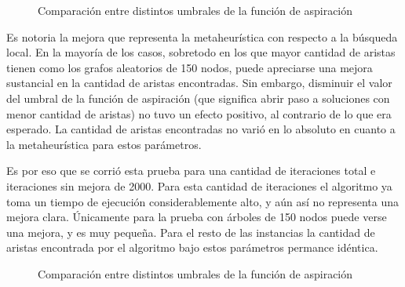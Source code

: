 

\begin{figure}[H]
    \centering
    \caption{Comparación entre distintos umbrales de la función de aspiración}
    \pgfplotstabletypeset[
        columns={0, solutions, localsearch, lowiterationlowaspiration, lowiterationhighaspiration, lowiterationfullaspiration}
    ]{\optimalsolutions}
\end{figure}

Es notoria la mejora que representa la metaheurística con respecto a la búsqueda local. En la mayoría de los casos, sobretodo en los que mayor cantidad de aristas tienen como los grafos aleatorios de 150 nodos, puede apreciarse una mejora sustancial en la cantidad de aristas encontradas. Sin embargo, disminuir el valor del umbral de la función de aspiración (que significa abrir paso a soluciones con menor cantidad de aristas) no tuvo un
efecto positivo, al contrario de lo que era esperado. La cantidad de aristas encontradas no varió en lo absoluto en cuanto a la metaheurística para estos parámetros.

Es por eso que se corrió esta prueba para una cantidad de iteraciones total e iteraciones sin mejora de 2000. Para esta cantidad de iteraciones el algoritmo ya toma un tiempo de ejecución considerablemente alto, y aún así no representa una mejora clara. Únicamente para la prueba con árboles de 150 nodos puede verse una mejora, y es muy pequeña. Para el resto de las instancias la cantidad de aristas encontrada por el algoritmo bajo estos parámetros permance idéntica.

\begin{figure}[H]
    \centering
    \caption{Comparación entre distintos umbrales de la función de aspiración}
    \pgfplotstabletypeset[
        columns={0, solutions, localsearch, highiterationlowaspiration, highiterationhighaspiration, highiterationfullaspiration}
    ]{\optimalsolutions}
\end{figure}

